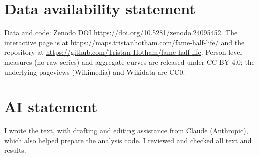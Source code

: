 \documentclass[11pt,a4paper]{article}
\begin{document}
\section*{Data availability statement}
Data and code: Zenodo DOI https://doi.org/10.5281/zenodo.24095452. The interactive page is at \url{https://maps.tristanhotham.com/fame-half-life/} and the repository at \url{https://github.com/Tristan-Hotham/fame-half-life}. Person-level measures (no raw series) and aggregate curves are released under CC BY 4.0; the underlying pageviews (Wikimedia) and Wikidata are CC0.

\section*{AI statement}
I wrote the text, with drafting and editing assistance from Claude (Anthropic), which also helped prepare the analysis code. I reviewed and checked all text and results.
\end{document}
